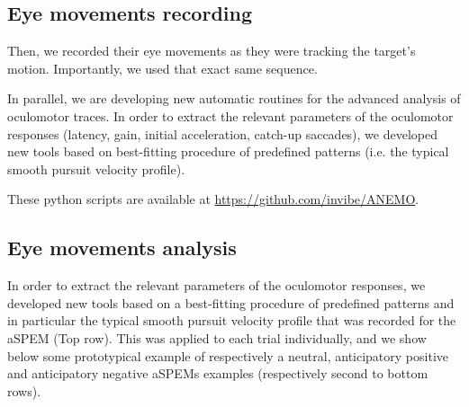 \documentclass[profile,final,english, draft]{article}%
\begin{document}

\subsection{Eye movements recording}
Then, we recorded their eye movements as they were tracking the target's motion. Importantly, we used that exact same sequence.


In parallel, we are developing new automatic routines for the advanced analysis of oculomotor traces. In order to extract the relevant parameters of the oculomotor responses (latency, gain, initial acceleration, catch-up saccades), we developed new tools based on best-fitting procedure of predefined patterns (i.e. the typical smooth pursuit velocity profile).

These python scripts are available at \url{https://github.com/invibe/ANEMO}.


\subsection{Eye movements analysis}

In order to extract the relevant parameters of the oculomotor responses, we developed new tools based on a best-fitting procedure of predefined patterns and in particular the typical smooth pursuit velocity profile that was recorded for the aSPEM (Top row). This was applied to each trial individually, and we show below some prototypical example of respectively a neutral, anticipatory positive and anticipatory negative aSPEMs examples (respectively second to bottom rows). 
\end{document}
